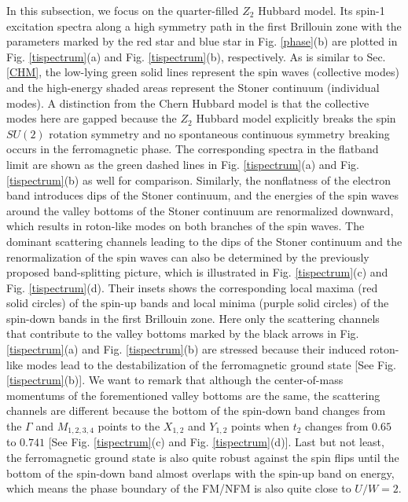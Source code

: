 \documentclass[amsmath,superscriptaddress,showpacs,aps,prb,twocolumn]{revtex4-1}
\begin{document}
\par In this subsection, we focus on the quarter-filled $Z_2$ Hubbard model. Its spin-1 excitation spectra along a high symmetry path in the first Brillouin zone with the parameters marked by the red star and blue star in Fig. \ref{phase}(b) are plotted in Fig. \ref{tispectrum}(a) and Fig. \ref{tispectrum}(b), respectively. As is similar to Sec. \ref{CHM}, the low-lying green solid lines represent the spin waves (collective modes) and the high-energy shaded areas represent the Stoner continuum (individual modes). A distinction from the Chern Hubbard model is that the collective modes here are gapped because the $Z_2$ Hubbard model explicitly breaks the spin $SU(2)$ rotation symmetry and no spontaneous continuous symmetry breaking occurs in the ferromagnetic phase. The corresponding spectra in the flatband limit are shown as the green dashed lines in Fig. \ref{tispectrum}(a) and Fig. \ref{tispectrum}(b) as well for comparison. Similarly, the nonflatness of the electron band introduces dips of the Stoner continuum, and the energies of the spin waves around the valley bottoms of the Stoner continuum are renormalized downward, which results in roton-like modes on both branches of the spin waves. The dominant scattering channels leading to the dips of the Stoner continuum and the renormalization of the spin waves can also be determined by the previously proposed band-splitting picture, which is illustrated in Fig. \ref{tispectrum}(c) and Fig. \ref{tispectrum}(d). Their insets shows the corresponding local maxima (red solid circles) of the spin-up bands and local minima (purple solid circles) of the spin-down bands in the first Brillouin zone. Here only the scattering channels that contribute to the valley bottoms marked by the black arrows in Fig. \ref{tispectrum}(a) and Fig. \ref{tispectrum}(b) are stressed because their induced roton-like modes lead to the destabilization of the ferromagnetic ground state [See Fig. \ref{tispectrum}(b)]. We want to remark that although the center-of-mass momentums of the forementioned valley bottoms are the same, the scattering channels are different because the bottom of the spin-down band changes from the $\Gamma$ and $M_{1,2,3,4}$ points to the $X_{1,2}$ and $Y_{1,2}$ points when $t_2$ changes from $0.65$ to $0.741$ [See Fig. \ref{tispectrum}(c) and Fig. \ref{tispectrum}(d)]. Last but not least, the ferromagnetic ground state is also quite robust against the spin flips until the bottom of the spin-down band almost overlaps with the spin-up band on energy, which means the phase boundary of the FM/NFM is also quite close to $U/W=2$.
\end{document}
